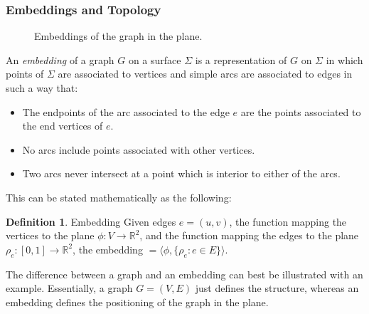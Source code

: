 \documentclass[11pt]{article}
\newcommand{\R}{\mathbb{R}}
\theoremstyle{definition}
\newtheorem{definition}{Definition}[section]
\begin{document}
\subsubsection{Embeddings and Topology}
    
    \begin{figure}%
		\centering
		\qquad
		\caption[]{Embeddings of the graph in the plane.}%
		\label{fig:embedding}
	\end{figure}
    
    	An \emph{embedding} of a graph $G$ on a surface $\Sigma$ is a representation of $G$ on $\Sigma$ in which points of $\Sigma$ are associated to vertices and simple arcs are associated to edges in such a way that:
  		\begin{itemize}
			\item The endpoints of the arc associated to the edge $e$ are the points associated to the end vertices of $e$.
			\item No arcs include points associated with other vertices.
			\item Two arcs never intersect at a point which is interior to either of the arcs.
  		\end{itemize}

	This can be stated mathematically as the following: 
	\theoremstyle{definition}
	\begin{definition}{Embedding}
		Given edges $e=(u,v)$, the function mapping the vertices to the plane $ \phi :V \rightarrow \R^2$, and the function mapping the edges to the plane $ \rho_e :[0,1] \rightarrow \R^2$, the embedding $= \langle \phi, \{\rho_e : e \in E \} \rangle$. 
	\end{definition}
		The difference between a graph and an embedding can best be illustrated with an example. 
		Essentially, a graph $G=(V,E)$ just defines the structure, whereas an embedding defines the positioning of the graph in the plane.
	
\end{document}
